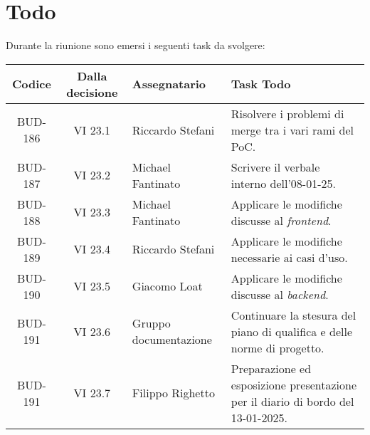 
\section{Todo}

Durante la riunione sono emersi i seguenti task da svolgere:

\vspace{0.5cm}

\begin{table}[htbp]
\centering
{}
\begin{tabular}{|c|c|p{}|p{}|}
    \hline
    \rowcolor[gray]{0.75}
    \textbf{Codice} & \textbf{Dalla decisione} & \textbf{Assegnatario} & \textbf{Task Todo} \\
    \hline
    BUD-186 & VI 23.1 & Riccardo Stefani & Risolvere i problemi di merge tra i vari rami del PoC. \\
    \hline
    BUD-187 & VI 23.2 & Michael Fantinato & Scrivere il verbale interno dell'08-01-25. \\
    \hline
    BUD-188 & VI 23.3 & Michael Fantinato & Applicare le modifiche discusse al \emph{frontend}. \\
    \hline
    BUD-189 & VI 23.4 & Riccardo Stefani & Applicare le modifiche necessarie ai casi d'uso. \\
    \hline
    BUD-190 & VI 23.5 & Giacomo Loat & Applicare le modifiche discusse al \emph{backend}. \\
    \hline
    BUD-191 & VI 23.6 & Gruppo documentazione & Continuare la stesura del piano di qualifica e delle norme di progetto. \\
    \hline
    BUD-191 & VI 23.7 & Filippo Righetto & Preparazione ed esposizione presentazione per il diario di bordo del 13-01-2025. \\
    \hline
\end{tabular}
\end{table}
